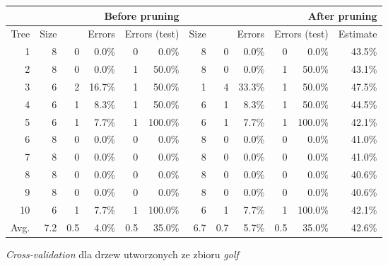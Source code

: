 \begin{figure}
\begin{tabular}{|r||r|rr|rr||r|rr|rr|r|}
\hline
&\multicolumn{5}{1||}{Before pruning}&\multicolumn{6}{1|}{After pruning} \\
\hline
Tree & 
Size & 
\multicolumn{2}{1|}{Errors} & 
\multicolumn{2}{1||}{Errors (test)} & 
Size & 
\multicolumn{2}{1|}{Errors} & 
\multicolumn{2}{1|}{Errors (test)} & 
Estimate \\
\hline\hline
    1 &    8 &    0 &  0.0\% &    0 &   0.0\% &    8 &    0 &  0.0\% &    0 &   0.0\% &  43.5\%  \\
    2 &    8 &    0 &  0.0\% &    1 &  50.0\% &    8 &    0 &  0.0\% &    1 &  50.0\% &  43.1\%  \\
    3 &    6 &    2 & 16.7\% &    1 &  50.0\% &    1 &    4 & 33.3\% &    1 &  50.0\% &  47.5\%  \\
    4 &    6 &    1 &  8.3\% &    1 &  50.0\% &    6 &    1 &  8.3\% &    1 &  50.0\% &  44.5\%  \\
    5 &    6 &    1 &  7.7\% &    1 & 100.0\% &    6 &    1 &  7.7\% &    1 & 100.0\% &  42.1\%  \\
    6 &    8 &    0 &  0.0\% &    0 &   0.0\% &    8 &    0 &  0.0\% &    0 &   0.0\% &  41.0\%  \\
    7 &    8 &    0 &  0.0\% &    0 &   0.0\% &    8 &    0 &  0.0\% &    0 &   0.0\% &  41.0\%  \\
    8 &    8 &    0 &  0.0\% &    0 &   0.0\% &    8 &    0 &  0.0\% &    0 &   0.0\% &  40.6\%  \\
    9 &    8 &    0 &  0.0\% &    0 &   0.0\% &    8 &    0 &  0.0\% &    0 &   0.0\% &  40.6\%  \\
   10 &    6 &    1 &  7.7\% &    1 & 100.0\% &    6 &    1 &  7.7\% &    1 & 100.0\% &  42.1\%  \\
\hline\hline
 Avg. &  7.2 &  0.5 &  4.0\% &  0.5 &  35.0\% &  6.7 &  0.7 &  5.7\% &  0.5 &  35.0\% &  42.6\%  \\
\hline
\end{tabular}
\caption{\emph{Cross-validation} dla drzew utworzonych ze zbioru \emph{golf}}
\label{p2t2-golf-trees-cv}
\end{figure}

